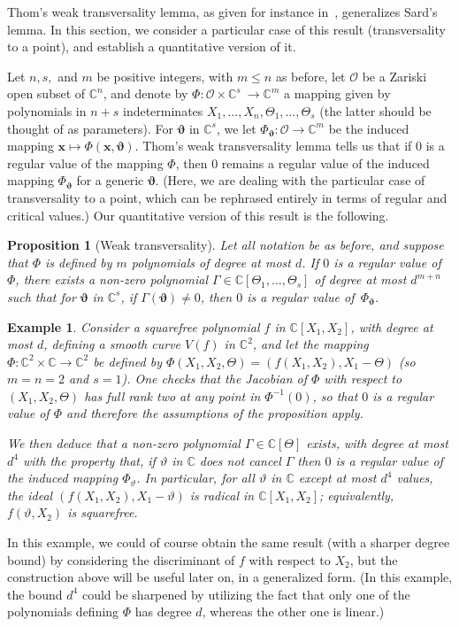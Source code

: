 \documentclass[12pt]{article}
\def\thetab{\bm{\vartheta}}
\def\xb{{\bm x}}
\def\vt{\vartheta}
\def\dt{s}
\def\C{\mathbb{C}}
\newtheorem{ex}[theorem]{Example}
\newtheorem{prop}[theorem]{Proposition}
\begin{document}
Thom's weak transversality lemma, as given for instance
in~\cite{demazure2000bifurcations}, generalizes Sard's lemma. In this
section, we consider a particular case of this result (transversality
to a point), and establish a quantitative version of it.

Let $n,\dt,$ and $m$ be positive integers, with $m \le n$ as before,
let $\mathscr{O}$ be a Zariski open subset of $\C^n$, and denote by
$\Phi: \mathscr{O} \times \C^{\dt} ~ \rightarrow \C^{m}$ a mapping
given by polynomials in $n+\dt$ indeterminates
$X_1,\dots,X_n,\Theta_1,\dots,\Theta_\dt$ (the latter should be
thought of as parameters). For $\thetab$ in $\C^{\dt}$, we let
$\Phi_{\thetab} : \mathscr{O} \rightarrow \C^{m}$ be the induced
mapping $\xb\mapsto\Phi(\xb,\thetab)$.  Thom's weak transversality
lemma tells us that if $0$ is a regular value of the mapping $\Phi$,
then $0$ remains a regular value of the induced mapping $\Phi_{\bm
  \vt}$ for a generic $\bm \vt$. (Here, we are dealing with the
particular case of transversality to a point, which can be rephrased
entirely in terms of regular and critical values.)  Our quantitative
version of this result is the following.

\begin{prop} [Weak transversality]\label{prop:weak_t}
  Let all notation be as before, and suppose that $\Phi$ is defined by
  $m$ polynomials of degree at most $d$. If $0$ is a regular value of
  $\Phi$, there exists a non-zero polynomial $\Gamma \in
  \C[\Theta_1,\dots,\Theta_s]$ of degree at most $d^{m+n}$ such that
  for $\thetab$ in $\C^\dt$, if $\Gamma(\thetab)\ne 0$, then $0$ is a
  regular value of~$\Phi_{\thetab}$.
\end{prop}
\begin{ex}
  Consider a squarefree polynomial $f$ in $\C[X_1,X_2]$, with degree
  at most $d$, defining a smooth curve $V(f)$ in $\C^2$, and let the
  mapping $\Phi:\C^2\times \C \to \C^2$ be defined by
  $\Phi(X_1,X_2,\Theta) = (f(X_1,X_2), X_1-\Theta)$ (so $m=n=2$ and
  $s=1$). One checks that the Jacobian of $\Phi$ with respect to
  $(X_1,X_2,\Theta)$ has full rank two at any point in $\Phi^{-1}(0)$,
  so that $0$ is a regular value of $ \Phi$ and therefore the
  assumptions of the proposition apply.

  We then deduce that a non-zero polynomial $\Gamma \in \C[\Theta]$
  exists, with degree at most $d^{4}$ with the property that, if
  $\vartheta$ in $\C$ does not cancel $\Gamma$ then $0$ is a regular
  value of the induced mapping $ \Phi_{\vartheta}$. In particular, for
  all $\vartheta$ in $\C$ except at most $d^4$ values, the ideal
  $(f(X_1,X_2), X_1-\vartheta)$ is radical in $\C[X_1,X_2]$;
  equivalently, $f(\vartheta, X_2)$ is squarefree.
\end{ex}
In this example, we could of course obtain the same result (with a
sharper degree bound) by considering the discriminant of $f$ with
respect to $X_2$, but the construction above will be useful later on,
in a generalized form. (In this example, the bound $d^4$ could be
sharpened by utilizing the fact that only one of the polynomials
defining $\Phi$ has degree $d$, whereas the other one is linear.)
\end{document}
